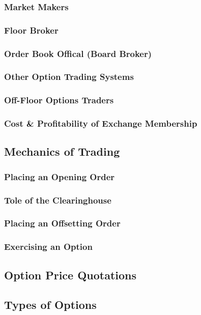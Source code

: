 \documentclass{book}
\theoremstyle{definition}
\theoremstyle{remark}
\begin{document}
        \subsubsection{Market Makers}
        \subsubsection{Floor Broker}
        \subsubsection{Order Book Offical (Board Broker)}
        \subsubsection{Other Option Trading Systems}
        \subsubsection{Off-Floor Options Traders}
        \subsubsection{Cost \& Profitability of Exchange Membership}
    \subsection{Mechanics of Trading}
        \subsubsection{Placing an Opening Order}
        \subsubsection{Tole of the Clearinghouse}
        \subsubsection{Placing an Offsetting Order}
        \subsubsection{Exercising an Option}
    \subsection{Option Price Quotations}
    \subsection{Types of Options}
\end{document}
